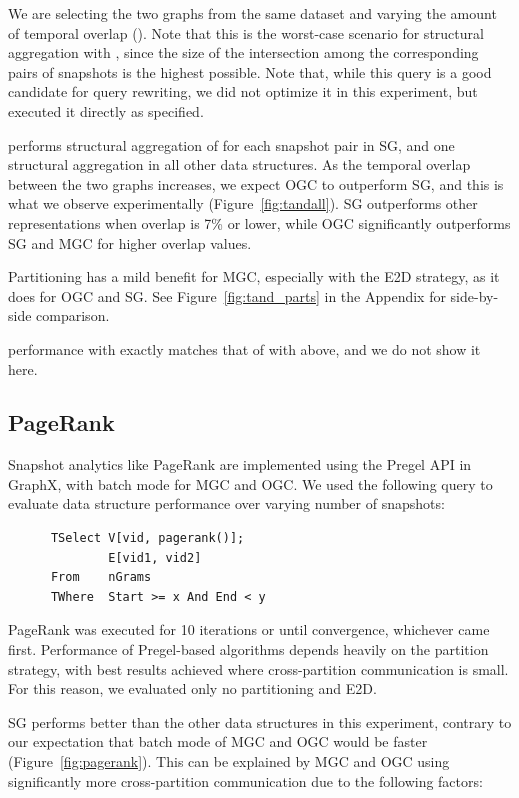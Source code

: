 We are selecting the two graphs from the same dataset and varying the
amount of temporal overlap ().  Note that this is the
worst-case scenario for structural aggregation with , since
the size of the intersection among the corresponding pairs of
snapshots is the highest possible.  Note that, while this query is a
good candidate for query rewriting, we did not optimize it in this
experiment, but executed it directly as specified.

 performs structural aggregation of for each snapshot pair
in SG, and one structural aggregation in all other data structures.
As the temporal overlap between the two graphs increases, we expect
OGC to outperform SG, and this is what we observe experimentally
(Figure~\ref{fig:tandall}).  SG outperforms other representations when
overlap is 7\% or lower, while OGC significantly outperforms SG and
MGC for higher overlap values.

Partitioning has a mild benefit for MGC, especially with the E2D
strategy, as it does for OGC and SG. See Figure~\ref{fig:tand_parts}
in the Appendix for side-by-side comparison.

 performance with  exactly matches that of
 with  above, and we do not show it here.

\subsection{PageRank}

Snapshot analytics like PageRank are implemented using
the Pregel API in GraphX, with batch mode for MGC and OGC.  We used
the following query to evaluate data structure performance over
varying number of snapshots:

\begin{small}
\begin{verbatim}
      TSelect V[vid, pagerank()];
              E[vid1, vid2]
      From    nGrams
      TWhere  Start >= x And End < y
\end{verbatim}
\end{small}

PageRank was executed for 10 iterations or until convergence,
whichever came first.  Performance of Pregel-based algorithms depends
heavily on the partition strategy, with best results achieved where
cross-partition communication is small.  For this reason, we evaluated
only no partitioning and E2D.

SG performs better than the other data structures in this experiment,
contrary to our expectation that batch mode of MGC and OGC would be
faster (Figure~\ref{fig:pagerank}).  This can be explained by MGC and
OGC using significantly more cross-partition communication due to the
following factors:

